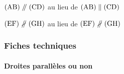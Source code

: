 \documentclass[12pt,a4paper]{article}
\begin{document}
\begin{latexex}
$\pgline{A}{B} \parallel \pgline{C}{D}$
au lieu de
$\pgline{A}{B}
 \stdparallel \pgline{C}{D}$

$\pgline{E}{F} \nparallel \pgline{G}{H}$
au lieu de
$\pgline{E}{F}
 \stdnparallel \pgline{G}{H}$
\end{latexex}




\subsubsection{Fiches techniques}

\paragraph{Droites parallèles ou non}



\extraspace


\end{document}

